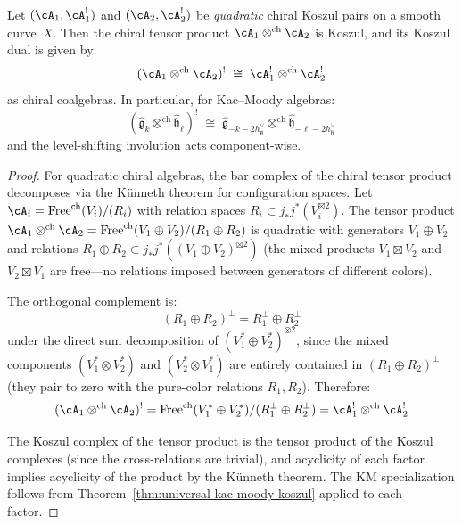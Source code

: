 \begin{proposition}
\label{prop:koszul-dual-tensor-product}
Let $(\cA_1, \cA_1^!)$ and $(\cA_2, \cA_2^!)$ be \emph{quadratic} chiral Koszul pairs
on a smooth curve~$X$.  Then the chiral tensor product $\cA_1 \otimes^{\mathrm{ch}} \cA_2$
is Koszul, and its Koszul dual is given by:
\begin{equation}\label{eq:koszul-dual-tensor}
(\cA_1 \otimes^{\mathrm{ch}} \cA_2)^! \;\cong\; \cA_1^! \otimes^{\mathrm{ch}} \cA_2^!
\end{equation}
as chiral coalgebras.  In particular, for Kac--Moody algebras:
\[
(\widehat{\mathfrak{g}}_k \otimes^{\mathrm{ch}} \widehat{\mathfrak{h}}_\ell)^!
\;\cong\;
\widehat{\mathfrak{g}}_{-k-2h^\vee_{\mathfrak{g}}}
\otimes^{\mathrm{ch}}
\widehat{\mathfrak{h}}_{-\ell-2h^\vee_{\mathfrak{h}}}
\]
and the level-shifting involution acts component-wise.
\end{proposition}

\begin{proof}
For quadratic chiral algebras, the bar complex of the chiral tensor product
decomposes via the K\"unneth theorem for configuration spaces.  Let
$\cA_i = \mathrm{Free}^{\mathrm{ch}}(V_i)/(R_i)$ with relation spaces
$R_i \subset j_*j^*(V_i^{\boxtimes 2})$.  The tensor product
$\cA_1 \otimes^{\mathrm{ch}} \cA_2 = \mathrm{Free}^{\mathrm{ch}}(V_1 \oplus V_2)/(R_1 \oplus R_2)$
is quadratic with generators $V_1 \oplus V_2$ and relations
$R_1 \oplus R_2 \subset j_*j^*((V_1 \oplus V_2)^{\boxtimes 2})$
(the mixed products $V_1 \boxtimes V_2$ and $V_2 \boxtimes V_1$
are free---no relations imposed between generators of different colors).

The orthogonal complement is:
\[
(R_1 \oplus R_2)^\perp = R_1^\perp \oplus R_2^\perp
\]
under the direct sum decomposition of $(V_1^* \oplus V_2^*)^{\otimes 2}$,
since the mixed components $(V_1^* \otimes V_2^*)$ and $(V_2^* \otimes V_1^*)$
are entirely contained in $(R_1 \oplus R_2)^\perp$ (they pair to zero with
the pure-color relations $R_1, R_2$).  Therefore:
\[
(\cA_1 \otimes^{\mathrm{ch}} \cA_2)^!
= \mathrm{Free}^{\mathrm{ch}}(V_1^* \oplus V_2^*)/(R_1^\perp \oplus R_2^\perp)
= \cA_1^! \otimes^{\mathrm{ch}} \cA_2^!
\]

The Koszul complex of the tensor product is the tensor product of the
Koszul complexes (since the cross-relations are trivial), and acyclicity
of each factor implies acyclicity of the product by the K\"unneth theorem.
The KM specialization follows from
Theorem~\ref{thm:universal-kac-moody-koszul} applied to each factor.
\end{proof}



